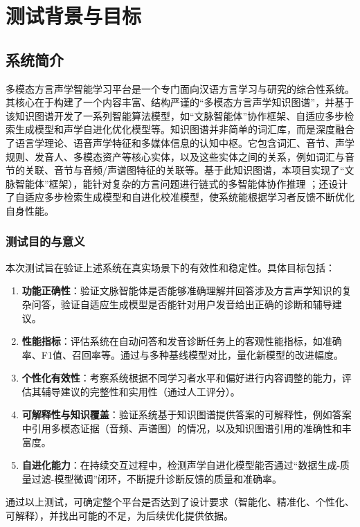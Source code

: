 
\chapter{测试背景与目标}
\section{系统简介}
多模态方言声学智能学习平台是一个专门面向汉语方言学习与研究的综合性系统。其核心在于构建了一个内容丰富、结构严谨的“多模态方言声学知识图谱”，并基于该知识图谱开发了一系列智能算法模型，如“文脉智能体”协作框架、自适应多步检索生成模型和声学自进化优化模型等。知识图谱并非简单的词汇库，而是深度融合了语言学理论、语音声学特征和多媒体信息的认知中枢。它包含词汇、音节、声学规则、发音人、多模态资产等核心实体，以及这些实体之间的关系，例如词汇与音节的关联、音节与音频/声谱图特征的关联等。基于此知识图谱，本项目实现了“文脉智能体”框架），能针对复杂的方言问题进行链式的多智能体协作推理 ；还设计了自适应多步检索生成模型和自进化校准模型，使系统能根据学习者反馈不断优化自身性能。
\subsection{测试目的与意义}
本次测试旨在验证上述系统在真实场景下的有效性和稳定性。具体目标包括：
\begin{enumerate}
    \item \textbf{功能正确性}：验证文脉智能体是否能够准确理解并回答涉及方言声学知识的复杂问答，验证自适应生成模型是否能针对用户发音给出正确的诊断和辅导建议。
    \item \textbf{性能指标}：评估系统在自动问答和发音诊断任务上的客观性能指标，如准确率、F1值、召回率等。通过与多种基线模型对比，量化新模型的改进幅度。
    \item \textbf{个性化有效性}：考察系统根据不同学习者水平和偏好进行内容调整的能力，评估其辅导建议的完整性和实用性（通过人工评分）。
    \item \textbf{可解释性与知识覆盖}：验证系统基于知识图谱提供答案的可解释性，例如答案中引用多模态证据（音频、声谱图）的情况，以及知识图谱引用的准确性和丰富度。
    \item \textbf{自进化能力}：在持续交互过程中，检测声学自进化模型能否通过“数据生成-质量过滤-模型微调”闭环，不断提升诊断反馈的质量和准确率。
\end{enumerate}

通过以上测试，可确定整个平台是否达到了设计要求（智能化、精准化、个性化、可解释），并找出可能的不足，为后续优化提供依据。
